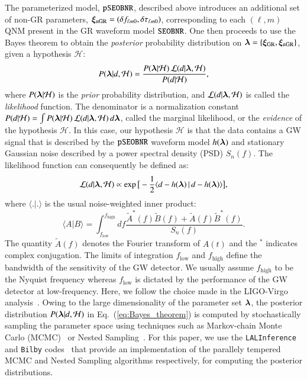 The parameterized model, $\texttt{pSEOBNR}$, described above introduces an additional set of non-GR parameters, $\bm{\xi}_{\text{nGR}} = (\delta f_{\ell m 0},\delta \tau_{\ell m 0})$, corresponding to each $(\ell,m)$ QNM present in the GR waveform model $\texttt{SEOBNR}$. One then proceeds to use the Bayes theorem to obtain the \emph{posterior} probability distribution on $\bm{\lambda} = \{\bm{\xi}_{\text{GR}}, \bm{\xi}_{\text{nGR}}\}$, given a hypothesis $\mathcal{H}$:
%
\begin{equation}
P(\bm{\lambda} | d, \mathcal{H}) = \frac{P(\bm{\lambda} | \mathcal{H}) \, \mathcal{L}(d | \bm{\lambda}, \mathcal{H})}{P(d|\mathcal{H})},
\label{eq:Bayes_theorem}
\end{equation}
%
where $P(\bm{\lambda} | \mathcal{H})$ is the \emph{prior} probability distribution, and $\mathcal{L}(d | \bm{\lambda}, \mathcal{H})$ is called the \emph{likelihood} function. The denominator is a normalization constant $P(d|\mathcal{H}) = \int P(\bm{\lambda} | \mathcal{H}) \, \mathcal{L}(d | \bm{\lambda}, \mathcal{H}) \, d\bm{\lambda}$, called the marginal likelihood, or the \emph{evidence} of the hypothesis $\mathcal{H}$. In this case, our hypothesis $\mathcal{H}$ is that the data contains a GW signal that is described by the $\texttt{pSEOBNR}$ waveform model $h(\bm{\lambda})$  and stationary Gaussian noise described by a power spectral density (PSD) $S_n(f)$. The likelihood function can consequently be defined as:
%
\begin{equation}
\mathcal{L}(d | \bm{\lambda}, \mathcal{H}) \propto \exp\big[-\frac{1}{2} \langle d - h(\bm{\lambda}) \, | \, d -h(\bm{\lambda}) \rangle \big],
\label{eq:likelihood}
\end{equation}
%
where $\langle . | . \rangle$ is the usual noise-weighted inner product:
%
\begin{equation}
\langle A | B \rangle = \int_{f_\mathrm{low}} ^{f_\mathrm{high}} df \frac{\tilde{A}^*(f)\tilde{B}(f) + \tilde{A}(f)\tilde{B}^*(f)}{S_n(f)}.
\label{eq:nwip}
\end{equation}
%
The quantity $\tilde{A}(f)$ denotes the Fourier transform of $A(t)$ and the $^*$ indicates complex conjugation. The limits of integration ${f_\mathrm{low}}$ and ${f_\mathrm{high}}$ define the bandwidth of the sensitivity of the GW detector. We usually assume ${f_\mathrm{high}}$ to be the Nyquist frequency whereas ${f_\mathrm{low}}$ is dictated by the performance of the
GW detector at low-frequency. Here, we follow the choice made in the LIGO-Virgo analysis~\cite{LIGOScientific:2018mvr,Abbott:2020niy}. Owing to the large dimensionality of the parameter set $\bm{\lambda}$, the posterior distribution $P(\bm{\lambda} | d, \mathcal{H})$ in Eq.~(\ref{eq:Bayes_theorem}) is computed by stochastically sampling the parameter space using techniques such as Markov-chain Monte Carlo (MCMC)~\cite{Metropolis:1953am,Hastings:1970aa} or Nested Sampling~\cite{Skilling:2006gxv}. For this paper, we use the \verb+LALInference+~\cite{Veitch:2014wba} and \verb+Bilby+ codes~\cite{Ashton:2018jfp,Smith:2019ucc} that provide an implementation of the parallely tempered MCMC and Nested Sampling algorithms respectively, for computing the posterior distributions.

